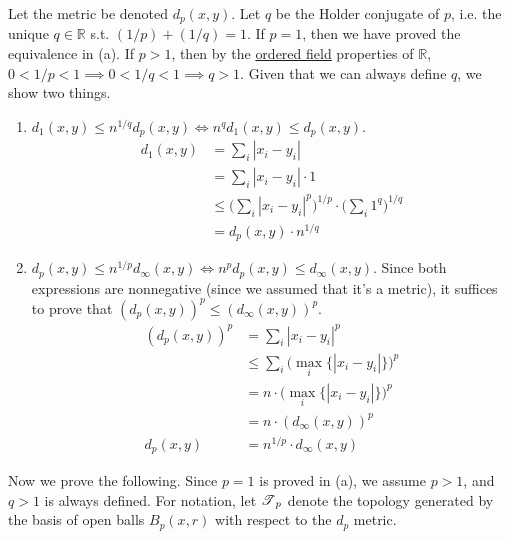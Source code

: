   \begin{solution}[Munkres 20.1.b]
    Let the metric be denoted $d_p (x, y)$. Let $q$ be the Holder conjugate of $p$, i.e. the unique $q \in \mathbb{R}$ s.t. $(1/p) + (1/q) = 1$. If $p = 1$, then we have proved the equivalence in (a). If $p > 1$, then by the \hyperref[alg-def:ordered-field]{ordered field} properties of $\mathbb{R}$, $0 < 1/p < 1 \implies 0 < 1/q < 1 \implies q > 1$. Given that we can always define $q$, we show two things. 
    \begin{enumerate}
      \item $d_1 (x, y) \leq n^{1/q} d_p (x, y) \iff n^q d_1 (x, y) \leq d_p (x, y)$. 
      \begin{align}
        d_1 (x, y) & = \sum_i |x_i - y_i| \\ 
                   & = \sum_i |x_i - y_i| \cdot 1 \\
                   & \leq \bigg( \sum_i |x_i - y_i|^p \bigg)^{1/p} \cdot \bigg(\sum_i 1^q \bigg)^{1/q} \\
                   & = d_p (x, y) \cdot n^{1/q}
      \end{align} 

      \item $d_p (x, y) \leq n^{1/p} d_\infty (x, y) \iff n^p d_p (x, y) \leq d_\infty (x, y)$. Since both expressions are nonnegative (since we assumed that it's a metric), it suffices to prove that $(d_p (x, y))^p \leq (d_\infty (x, y))^{p}$. 
      \begin{align}
        (d_p(x, y))^p & = \sum_i |x_i - y_i|^p \\
                      & \leq \sum_i \big( \max_i \{ |x_i - y_i| \} \big)^p \\
                      & = n \cdot \big( \max_i \{ |x_i - y_i| \} \big)^p \\ 
                      & = n \cdot (d_\infty (x, y))^p \\
        d_p(x, y)     & = n^{1/p} \cdot d_\infty (x, y)
      \end{align}
    \end{enumerate} 
    Now we prove the following. Since $p = 1$ is proved in (a), we assume $p > 1$, and $q > 1$ is always defined. For notation, let $\operatorname{\mathscr{T}}_p$ denote the topology generated by the basis of open balls $B_p (x, r)$ with respect to the $d_p$ metric. 


\end{solution}
